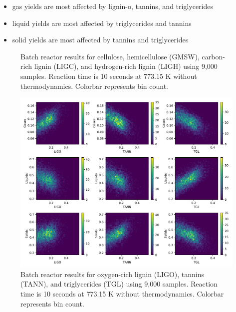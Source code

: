 \begin{itemize}
    \item gas yields are most affected by lignin-o, tannins, and triglycerides
    \item liquid yields are most affected by triglycerides and tannins
    \item solid yields are most affected by tannins and triglycerides
\end{itemize}

\begin{figure}[H]
    \centering
    \caption{Batch reactor results for cellulose, hemicellulose (GMSW), carbon-rich lignin (LIGC), and hydrogen-rich lignin (LIGH) using 9,000 samples. Reaction time is 10 seconds at 773.15 K without thermodynamics. Colorbar represents bin count.}
    \label{fig:batch-sa1}
\end{figure}

\begin{figure}[H]
    \centering
    \includegraphics[width=\textwidth]{figures/sa-hexbin2-n1000.pdf}
    \caption{Batch reactor results for oxygen-rich lignin (LIGO), tannins (TANN), and triglycerides (TGL) using 9,000 samples. Reaction time is 10 seconds at 773.15 K without thermodynamics. Colorbar represents bin count.}
    \label{fig:batch-sa2}
\end{figure}


